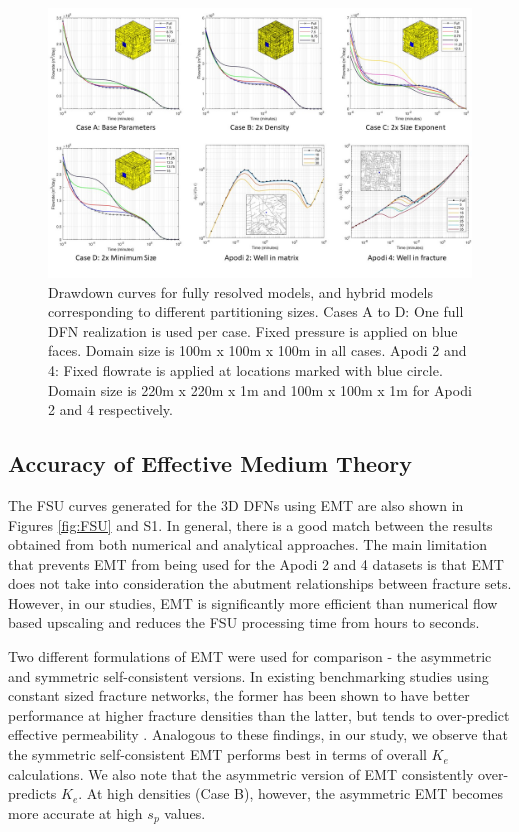 \documentclass[draft]{agujournal2018}
\begin{document}
\begin{figure}[h]
	\centering
	
	\includegraphics[width=\textwidth]{DD_main/DD_main.jpg}
	
	\caption{Drawdown curves for fully resolved models, and hybrid models corresponding to different partitioning sizes. Cases A to D: One full DFN realization is used per case. Fixed pressure is applied on blue faces. Domain size is 100m x 100m x 100m in all cases. Apodi 2 and 4: Fixed flowrate is applied at locations marked with blue circle. Domain size is 220m x 220m x 1m and 100m x 100m x 1m for Apodi 2 and 4 respectively.}
	\label{fig:DD}
\end{figure}

\subsection{Accuracy of Effective Medium Theory}
The FSU curves generated for the 3D DFNs using EMT are also shown in Figures \ref{fig:FSU} and S1. In general, there is a good match between the results obtained from both numerical and analytical approaches. The main limitation that prevents EMT from being used for the Apodi 2 and 4 datasets is that EMT does not take into consideration the abutment relationships between fracture sets. However, in our studies, EMT is significantly more efficient than numerical flow based upscaling and reduces the FSU processing time from hours to seconds.

Two different formulations of EMT were used for comparison - the asymmetric and symmetric self-consistent versions. In existing benchmarking studies using constant sized fracture networks, the former has been shown to have better performance at higher fracture densities than the latter, but tends to over-predict effective permeability \citep{Saevik2013, Saevik2014}. Analogous to these findings, in our study, we observe that the symmetric self-consistent EMT performs best in terms of overall $K_e$ calculations. We also note that the asymmetric version of EMT consistently over-predicts $K_e$. At high densities (Case B), however, the asymmetric EMT becomes more accurate at high $s_p$ values.
\end{document}
